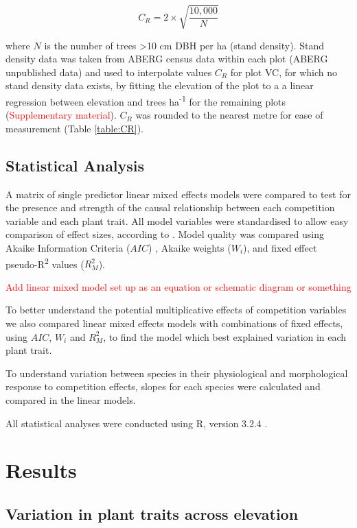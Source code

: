 \documentclass[a4paper,11pt]{article}
\newcommand{\todo}[1]{\textcolor{red}{#1}}   %
\begin{document}
\begin{equation}
\label{eq:CR}
C_R = 2 \times \sqrt{\frac{10,000}{N}}
\end{equation}

where $N$ is the number of trees \textgreater10 cm DBH per ha (stand density). Stand density data was taken from ABERG census data within each plot (ABERG unpublished data) and used to interpolate values $C_R$ for plot VC, for which no stand density data exists, by fitting the elevation of the plot to a a linear regression between elevation and trees ha\textsuperscript{-1} for the remaining plots (\todo{Supplementary material}). $C_R$ was rounded to the nearest metre for ease of measurement (Table \ref{table:CR}). 

\subsection*{Statistical Analysis}
A matrix of single predictor linear mixed effects models were compared to test for the presence and strength of the causal relationship between each competition variable and each plant trait. All model variables were standardised to allow easy comparison of effect sizes, according to \citep{Gelman2008, Grueber2011, Gelman2014}. Model quality was compared using Akaike Information Criteria ($AIC$) \citep{Akaike1998}, Akaike weights ($W_i$), and fixed effect pseudo-R\textsuperscript{2} values ($R_M^2$). 

\todo{Add linear mixed model set up as an equation or schematic diagram or something}

To better understand the potential multiplicative effects of competition variables we also compared linear mixed effects models with combinations of fixed effects, using $AIC$, $W_i$ and $R_M^2$, to find the model which best explained variation in each plant trait.

To understand variation between species in their physiological and morphological response to competition effects, slopes for each species were calculated and compared in the linear models. 

All statistical analyses were conducted using R, version 3.2.4 \citep{R2016}.

\section*{Results}

\subsection{Variation in plant traits across elevation}
\end{document}
